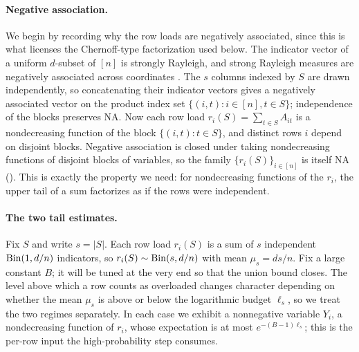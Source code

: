 \paragraph{Negative association.}
We begin by recording why the row loads are negatively associated, since this is what licenses the Chernoff-type
factorization used below. The indicator vector of a uniform $d$-subset of $[n]$ is strongly Rayleigh, and strong Rayleigh
measures are negatively associated across coordinates \cite{BorceaBrandenLiggett2009}. The $s$ columns indexed by $S$ are
drawn independently, so concatenating their indicator vectors gives a negatively associated vector on the product index set
$\{(i,t):i\in[n],t\in S\}$; independence of the blocks preserves NA. Now each row load $r_i(S)=\sum_{t\in S}A_{it}$ is a
nondecreasing function of the block $\{(i,t):t\in S\}$, and distinct rows $i$ depend on disjoint blocks. Negative
association is closed under taking nondecreasing functions of disjoint blocks of variables, so the family
$\{r_i(S)\}_{i\in[n]}$ is itself NA (). This is exactly the property we need: for nondecreasing functions
of the $r_i$, the upper tail of a sum factorizes as if the rows were independent.

\paragraph{The two tail estimates.}
Fix $S$ and write $s=|S|$. Each row load $r_i(S)$ is a sum of $s$ independent $\mathrm{Bin}(1,d/n)$ indicators, so
$r_i(S)\sim\mathrm{Bin}(s,d/n)$ with mean $\mu_s=ds/n$. Fix a large constant $B$; it will be tuned at the very end so that the union
bound closes. The level above which a row counts as overloaded changes character depending on whether the mean $\mu_s$ is
above or below the logarithmic budget $\ell_s$, so we treat the two regimes separately. In each case we exhibit a
nonnegative variable $Y_i$, a nondecreasing function of $r_i$, whose expectation is at most $e^{-(B-1)\ell_s}$; this is the
per-row input the high-probability step consumes.

